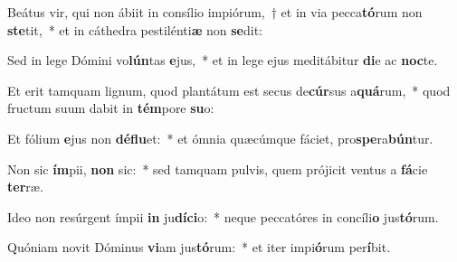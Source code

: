 \item Beátus vir, qui non ábiit in consílio impiórum,~† et in via pecca\textbf{tó}rum non \textbf{ste}tit,~* et in cáthedra pestilénti\textbf{æ} non \textbf{se}dit:
\item Sed in lege Dómini vo\textbf{lún}tas \textbf{e}jus,~* et in lege ejus meditábitur \textbf{di}e ac \textbf{noc}te.
\item Et erit tamquam lignum, quod plantátum est secus de\textbf{cúr}sus a\textbf{quá}rum,~* quod fructum suum dabit in \textbf{tém}pore \textbf{su}o:
\item Et fólium \textbf{e}jus non \textbf{dé}\textbf{flu}et:~* et ómnia quæcúmque fáciet, pro\textbf{spe}ra\textbf{bún}tur.
\item Non sic \textbf{ím}pii, \textbf{non} sic:~* sed tamquam pulvis, quem prójicit ventus a \textbf{fá}cie \textbf{ter}ræ.
\item Ideo non resúrgent ímpii \textbf{in} ju\textbf{dí}\textbf{ci}o:~* neque peccatóres in concíli\textbf{o} jus\textbf{tó}rum.
\item Quóniam novit Dóminus \textbf{vi}am jus\textbf{tó}rum:~* et iter impi\textbf{ó}rum per\textbf{í}bit.
